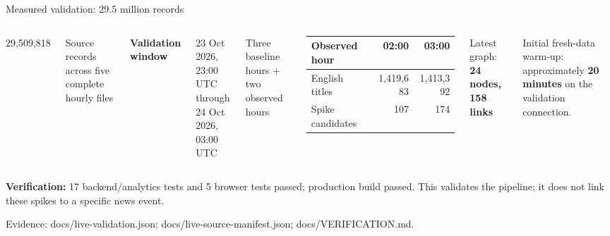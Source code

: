 \documentclass[aspectratio=169,10pt]{beamer}
\newcommand{\takeaway}[1]{\vfill{\color{Lime}\small #1}}
\newcommand{\source}[1]{{\color{Muted}\tiny #1}}
\begin{document}
\begin{frame}{Measured validation: 29.5 million records}
\begin{columns}[T]
{\Huge\color{Lime}29,509,818}\par\medskip
Source records across five complete hourly files\par\bigskip
\textbf{Validation window}\par
23 Oct 2026, 23:00 UTC through\\24 Oct 2026, 03:00 UTC\par\medskip
Three baseline hours + two observed hours
\begin{tabular}{lrr}
\toprule
\textbf{Observed hour} & \textbf{02:00} & \textbf{03:00}\\\midrule
English titles & 1,419,683 & 1,413,392\\[2mm]
Spike candidates & 107 & 174\\\bottomrule
\end{tabular}
\bigskip\par
Latest graph: \textbf{24 nodes, 158 links}\par\medskip
Initial fresh-data warm-up: approximately \textbf{20 minutes} on the validation connection.
\end{columns}
\vspace{3mm}\par
\small\textbf{Verification:} 17 backend/analytics tests and 5 browser tests passed; production build passed.
\takeaway{This validates the pipeline; it does not link these spikes to a specific news event.}\par
\source{Evidence: docs/live-validation.json; docs/live-source-manifest.json; docs/VERIFICATION.md.}
\end{frame}
\end{document}
